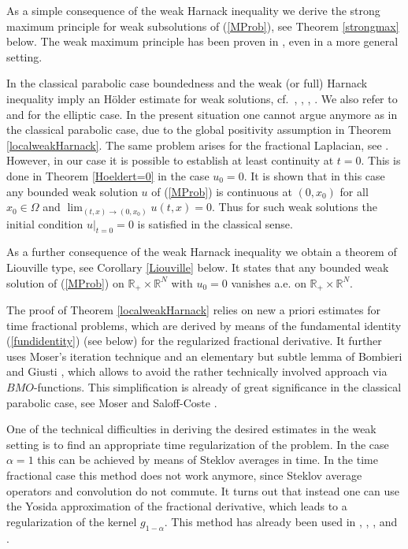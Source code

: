 \documentclass[10pt]{article}
\newcommand{\iR}{\mathbb{R}}
\begin{document}
As a simple consequence of the weak Harnack inequality we derive the
strong maximum principle for weak subsolutions of (\ref{MProb}), see
Theorem \ref{strongmax} below. The weak maximum principle has been
proven in \cite{Za2}, even in a more general setting.

In the classical parabolic case boundedness and the weak (or full)
Harnack inequality imply an H\"older estimate for weak solutions,
cf.\ \cite{DB}, \cite{LSU}, \cite{Lm}, \cite{Moser64}. We also refer
to \cite{GilTrud} and \cite{Mosell} for the elliptic case. In the
present situation one cannot argue anymore as in the classical
parabolic case, due to the global positivity assumption in Theorem
\ref{localweakHarnack}. The same problem arises for the fractional
Laplacian, see \cite{Silv}. However, in our case it is possible to
establish at least continuity at $t=0$. This is done in Theorem
\ref{Hoeldert=0} in the case $u_0=0$. It is shown that in this case
any bounded weak solution $u$ of (\ref{MProb}) is continuous at
$(0,x_0)$ for all $x_0\in \Omega$ and $\lim_{(t,x)\to
(0,x_0)}u(t,x)=0$. Thus for such weak solutions the initial
condition $u|_{t=0}=0$ is satisfied in the classical sense.

As a further consequence of the weak Harnack inequality we obtain a
theorem of Liouville type, see Corollary \ref{Liouville} below. It
states that any bounded weak solution of (\ref{MProb}) on
$\iR_+\times \iR^N$ with $u_0=0$ vanishes a.e. on $\iR_+\times
\iR^N$.

The proof of Theorem \ref{localweakHarnack} relies on new a priori
estimates for time fractional problems, which are derived by means
of the fundamental identity (\ref{fundidentity}) (see below) for the
regularized fractional derivative. It further uses Moser's iteration
technique and an elementary but subtle lemma of Bombieri and Giusti
\cite{BomGiu}, which allows to avoid the rather technically involved
approach via $BMO$-functions. This simplification is already of
great significance in the classical parabolic case, see Moser
\cite{Moser71} and Saloff-Coste \cite{SalCoste}.

One of the technical difficulties in deriving the desired estimates
in the weak setting is to find an appropriate time regularization of
the problem. In the case $\alpha=1$ this can be achieved by means of
Steklov averages in time. In the time fractional case this method
does not work anymore, since Steklov average operators and
convolution do not commute. It turns out that instead one can use
the Yosida approximation of the fractional derivative, which leads
to a regularization of the kernel $g_{1-\alpha}$. This method has
already been used in \cite{Grip1}, \cite{VZ}, \cite{ZWH}, and
\cite{Za2}.
\end{document}
